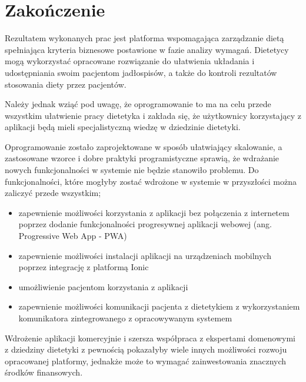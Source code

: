 \chapter*{Zakończenie}\label{ch:ending}
Rezultatem wykonanych prac jest platforma wspomagająca zarządzanie dietą spełniająca kryteria biznesowe postawione w fazie analizy wymagań.
Dietetycy mogą wykorzystać opracowane rozwiązanie do ułatwienia układania i udostępniania swoim pacjentom jadłospisów,
a także do kontroli rezultatów stosowania diety przez pacjentów.

\par
Należy jednak wziąć pod uwagę, że oprogramowanie to ma na celu przede wszystkim ułatwienie pracy dietetyka
i zakłada się, że użytkownicy korzystający z aplikacji będą mieli specjalistyczną wiedzę w dziedzinie dietetyki.

\par
Oprogramowanie zostało zaprojektowane w sposób ułatwiający skalowanie,
a zastosowane wzorce i dobre praktyki programistyczne sprawią, że wdrażanie nowych funkcjonalności w systemie nie będzie stanowiło problemu.
Do funkcjonalności, które mogłyby zostać wdrożone w systemie w przyszłości można zaliczyć przede wszystkim;
\begin{itemize}
    \item zapewnienie możliwości korzystania z aplikacji bez połączenia z internetem poprzez dodanie funkcjonalności progresywnej aplikacji webowej (ang. Progressive Web App - PWA)\cite{url:pwa}
    \item zapewnienie możliwości instalacji aplikacji na urządzeniach mobilnych poprzez integrację z platformą Ionic\cite{tech:ionic}
    \item umożliwienie pacjentom korzystania z aplikacji
    \item zapewnienie możliwości komunikacji pacjenta z dietetykiem z wykorzystaniem komunikatora zintegrowanego z opracowywanym systemem
\end{itemize}

\par
Wdrożenie aplikacji komercyjnie i szersza współpraca z ekspertami domenowymi z dziedziny dietetyki z pewnością pokazałyby wiele innych możliwości rozwoju opracowanej platformy,
jednakże może to wymagać zainwestowania znacznych środków finansowych.
\thispagestyle{normal}
